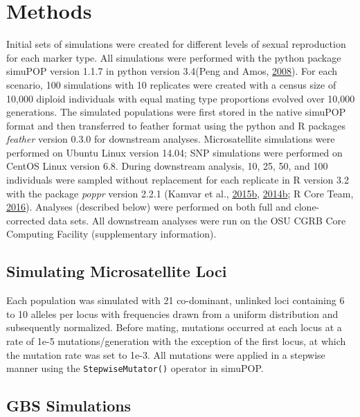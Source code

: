 \documentclass[double,12pt]{beavtex}
\begin{document}
  \section{Methods}\label{methods}
  
  Initial sets of simulations were created for different levels of sexual
  reproduction for each marker type. All simulations were performed with
  the python package simuPOP version 1.1.7 in python version 3.4(Peng and
  Amos, \protect\hyperlink{ref-peng2008forward}{2008}). For each scenario,
  100 simulations with 10 replicates were created with a census size of
  10,000 diploid individuals with equal mating type proportions evolved
  over 10,000 generations. The simulated populations were first stored in
  the native simuPOP format and then transferred to feather format using
  the python and R packages \emph{feather} version 0.3.0 for downstream
  analyses. Microsatellite simulations were performed on Ubuntu Linux
  version 14.04; SNP simulations were performed on CentOS Linux version
  6.8. During downstream analysis, 10, 25, 50, and 100 individuals were
  sampled without replacement for each replicate in R version 3.2 with the
  package \emph{poppr} version 2.2.1 (Kamvar et al.,
  \protect\hyperlink{ref-kamvar2015novel}{2015}\protect\hyperlink{ref-kamvar2015novel}{b},
  \protect\hyperlink{ref-kamvar2014poppr}{2014}\protect\hyperlink{ref-kamvar2014poppr}{b};
  R Core Team, \protect\hyperlink{ref-R2016}{2016}). Analyses (described
  below) were performed on both full and clone-corrected data sets. All
  downstream analyses were run on the OSU CGRB Core Computing Facility
  (supplementary information).
  
  \subsection{Simulating Microsatellite
  Loci}\label{simulating-microsatellite-loci}
  
  Each population was simulated with 21 co-dominant, unlinked loci
  containing 6 to 10 alleles per locus with frequencies drawn from a
  uniform distribution and subsequently normalized. Before mating,
  mutations occurred at each locus at a rate of 1e-5 mutations/generation
  with the exception of the first locus, at which the mutation rate was
  set to 1e-3. All mutations were applied in a stepwise manner using the
  \texttt{StepwiseMutator()} operator in simuPOP.
  
  \subsection{GBS Simulations}\label{gbs-simulations}
  
\end{document}
